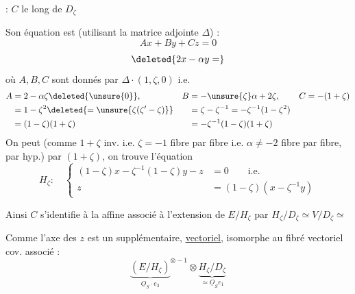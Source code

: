 
 : $C$ le long de $D_{\zeta}$

Son équation est (utilisant la matrice
adjointe  $\Delta$) :
\[
Ax+By+Cz=0
\]
\[
\deleted{2x-\alpha y=}
\]
où $A,B,C$ sont donnés par $\Delta\cdot(1,\zeta,0)$ i.e.
\[
\begin{aligned}
 A&=2-\alpha\zeta\deleted{\unsure{0}}, & B&=-\unsure{\zeta}\alpha+2\zeta, & C&=-(1+\zeta)\\
 &=1-\zeta^2\deleted{=\unsure{\zeta(\zeta'-\zeta)}}&&=\zeta-\zeta^{-1}=-\zeta^{-1}(1-\zeta^2)\\
 &=(1-\zeta)(1+\zeta)&&=-\zeta^{-1}(1-\zeta)(1+\zeta)
\end{aligned}
\]
On peut (comme $1+\zeta$  inv. i.e. $\zeta=-1$ fibre par
fibre i.e. $\alpha\ne-2$ fibre par fibre, par hyp.) 
par $(1+\zeta)$, on trouve l'équation
\[
H_\zeta:\quad\left\{\begin{aligned}
 (1-\zeta)x-\zeta^{-1}(1-\zeta)y-z&=0\qquad\text{i.e.}\\
 z&=(1-\zeta)(x-\zeta^{-1}y)
\end{aligned}\right.
\]

Ainsi $C$ s'identifie à la   affine
associé à l'extension de $E/H_\zeta$ par $H_\zeta/D_\zeta\simeq V/D_\zeta\simeq$

Comme l'axe des $z$  est un supplémentaire,
   \uline{vectoriel}, isomorphe au fibré
vectoriel cov. associé :
\[
{\underbrace{(E/H_\zeta)}_{\underline{O}_S\cdot e_3}}^{\otimes-1}\otimes
\underbrace{H_\zeta/D_\zeta}_{\simeq\underline{O}_S e_1}
\]



